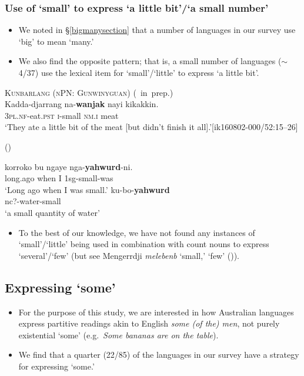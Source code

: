 \documentclass{article}
\makeatletter
\newcommand{\ofy}{/85} %
\makeatother
\begin{document}
\subsubsection{Use of `small' to express `a little bit'/`a small number'}

\begin{itemize}
\item We noted in \S\ref{bigmanysection} that a number of languages in our survey use `big' to mean `many.'
\item We also find the opposite pattern; that is, a small number of languages ($\sim$4/37) use the lexical item for `small'/`little' to express `a little bit'. %
\end{itemize}
\begin{exe}
  \ex\label{ex:lil} \textsc{Kunbarlang (nPN: Gunwinyguan)} (\citealt{ikthesis}~in~prep.)\\
  \gll Kadda-djarrang na-\textbf{wanjak} nayi kikakkin.\\
  \textsc{3pl.nf}-eat.\textsc{pst} \textsc{i}-small \textsc{nm.i} meat\\
  \glt `They ate a little bit of the meat [but didn't finish it all].'\hfill [ik160802-000/52:15--26]

  \newpage
   (\citealt[76,116]{carroll76}) 
  \begin{xlist}
    \ex 
    \gll korroko     bu    ngaye        nga-\textbf{yahwurd}-ni. \\
    long.ago    when    I        1{\sc sg}-small-was \\
    \glt    `Long ago when I was small.'
    \ex \gll ku-bo-\textbf{yahwurd} \\
    {\sc nc?}-water-small\\
    \glt `a small quantity of water' 
  \end{xlist}
\end{exe}

\begin{itemize}
\item To the best of our knowledge, we have not found any instances of `small'/`little' being used in combination with count nouns to express `several'/`few' (but see Mengerrdji \textit{melebenb} `small,' `few' (\citealt[70]{birch06})).
\end{itemize}    


\subsection{Expressing `some'}
\begin{itemize}
\item For the purpose of this study, we are interested in how Australian languages express partitive readings akin to English {\it some (of the) men}, not purely existential `some' (e.g.\ {\it Some bananas are on the table}).
\item We find that a quarter (22\ofy) of the languages in our survey have a strategy for expressing `some.'
\end{itemize}
\end{document}
